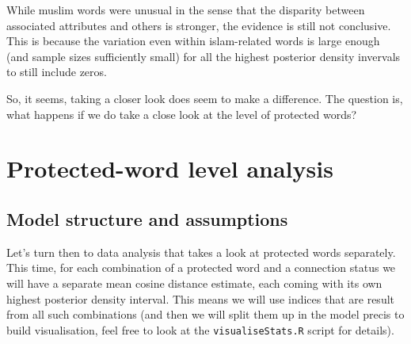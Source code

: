 \documentclass[
  12pt,
]{book}
\begin{document}
\normalsize

While muslim words were unusual in the sense that the disparity between associated attributes and others is stronger, the evidence is still not conclusive. This is because the variation even within islam-related words is large enough (and sample sizes sufficiently small) for all the highest posterior density invervals to still include zeros.

So, it seems, taking a closer look does seem to make a difference. The question is, what happens if we do take a close look at the level of protected words?

\hypertarget{protected-word-level-analysis}{%
\chapter{Protected-word level analysis}\label{protected-word-level-analysis}}

\hypertarget{model-structure-and-assumptions}{%
\section{Model structure and assumptions}\label{model-structure-and-assumptions}}

Let's turn then to data analysis that takes a look at protected words separately. This time, for each combination of a protected word and a connection status we will have a separate mean cosine distance estimate, each coming with its own highest posterior density interval. This means we will use indices that are result from all such combinations (and then we will split them up in the model precis to build visualisation, feel free to look at the \texttt{visualiseStats.R} script for details).

\vspace{1mm}
\footnotesize
\end{document}
